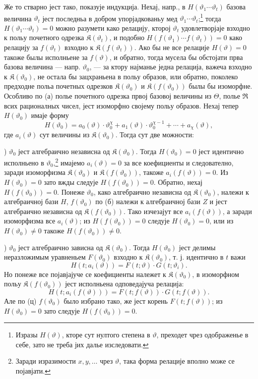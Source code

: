 ﻿\documentclass[11pt]{article}
\providecommand{\Kfield}{\mathfrak K}
\providecommand{\Rfield}{\mathfrak R}
\begin{document}
Же то стварно јест тако, показује индукција. Нехај, напр., в \(H(\vartheta_1\cdots\vartheta_t)\) базова величина \(\vartheta_t\) јест последньа в добром упорјадкованьу мед \(\vartheta_1\cdots\vartheta_t\);\footnote{Изразы \(H(\vartheta)\), кторе сут нултого степена в \(\vartheta\), преходет чрез одображенье в себе, зато не треба јих далье изследовати.} тогда \(H(\vartheta_1\cdots\vartheta_t)=0\) можно разумети како релацију, кторој \(\vartheta_t\) удовлетворјаје взходно к польу почетного одрезка \(\Kfield(\vartheta_t)\), и подобно \(H(f(\vartheta_1)\cdots f(\vartheta_t))=0\) како релацију за \(f(\vartheta_t)\) взходно к \(\Kfield(f(\vartheta_t))\). Ако бы не все релације \(H(\vartheta)=0\) такоже былы исполньене за \(f(\vartheta)\), и обратно, тогда мусела бы обстојати прва базова величина --- напр. \(\vartheta_0\), --- за ктору најманье једна релација, важеча взходно к \(\Kfield(\vartheta_0)\), не остала бы зацхраньена в польу образов, или обратно, поколеко предходне польа почетных одрезков \(\Kfield(\vartheta_0)\) и \(\Kfield(f(\vartheta_0))\) былы бы изоморфне. Особливо по (а) полье почетного одрезка првој базовој величины из \(\Theta\), полье \(\Rfield\) всих рационалных чисел, јест изоморфно својему польу образов. Нехај тепер \(H(\vartheta_0)\) имаје форму
\[
H(\vartheta_0)=a_0(\vartheta)\cdot\vartheta_0^\chi
+a_1(\vartheta)\cdot\vartheta_0^{\chi-1}+\cdots+a_\chi(\vartheta),
\]
где \(a_i(\vartheta)\) сут величины из \(\Kfield(\vartheta_0)\). Тогда сут две можности:

) \(\vartheta_0\) јест алгебраично независна од \(\Kfield(\vartheta_0)\). Тогда \(H(\vartheta_0)=0\) јест идентично исполньено в \(\vartheta_0\),\footnote{Заради изразимости \(x,y,\ldots\) чрез \(\vartheta\), така форма релације вполно може се појавјати.} имајемо \(a_i(\vartheta)=0\) за все коефициенты и следователно, заради изоморфизма \(\Kfield(\vartheta_0)\) и \(\Kfield(f(\vartheta_0))\), такоже \(a_i(f(\vartheta))=0\). Из \(H(\vartheta_0)=0\) зато вжды следује \(H(f(\vartheta_0))=0\). Обратно, нехај \(H(f(\vartheta_0))=0\). Понеже \(\vartheta_0\), како алгебраично независна од \(\Kfield(\vartheta_0)\), належи к алгебраичној бази \(H\), \(f(\vartheta_0)\) по (б) належи к алгебраичној бази \(Z\) и јест алгебраично независна од \(\Kfield(f(\vartheta_0))\). Тако изчезајут все \(a_i(f(\vartheta))\), а заради изоморфизма все \(a_i(\vartheta)\); из \(H(f(\vartheta_0))=0\) следује \(H(\vartheta_0)=0\), или из \(H(\vartheta_0)\ne0\) такоже \(H(f(\vartheta_0))\ne0\).

) \(\vartheta_0\) јест алгебраично зависна од \(\Kfield(\vartheta_0)\). Тогда \(H(\vartheta_0)\) јест делимы неразложимым уравненьем \(F(\vartheta_0)\) взходно к \(\Kfield(\vartheta_0)\), т. ј. идентично в \(t\) важи
\[
H(t;a_i(\vartheta))=F(t;\vartheta)\cdot G(t;\vartheta_i).
\]
Но понеже все појавјајуче се коефициенты належет к \(\Kfield(\vartheta_0)\), в изоморфном польу \(\Kfield(f(\vartheta_0))\) јест исполньена одповедајуча релација:
\[
H(t;a_i(f(\vartheta)))=F(t;f(\vartheta))\cdot G(t;f(\vartheta)).
\]
Але по (ц) \(f(\vartheta_0)\) было избрано тако, же јест корень \(F(t;f(\vartheta))\); из \(H(\vartheta_0)=0\) зато следује \(H(f(\vartheta_0))=0\).
\end{document}

